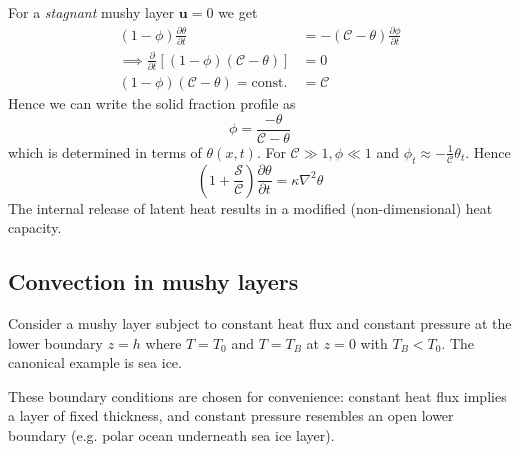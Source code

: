 \documentclass{jknotes}
\renewcommand{\u}{\symbf{u}}
\newcommand{\C}{\mathcal{C}}
\renewcommand{\S}{\mathcal{S}}
\begin{document}
For a \emph{stagnant} mushy layer $\u = 0$ we get
\begin{align}
	(1-\phi)\frac{\partial \theta}{\partial t} &= -(\C - \theta)\frac{\partial
	\phi}{\partial t} \\
		\implies \frac{\partial}{\partial t}\left[ (1-\phi)(\C-\theta)\right]
		&= 0 \\
	(1-\phi)(\C-\theta) = \text{const.} &= \C
\end{align}
Hence we can write the solid fraction profile as
\begin{equation}
	\phi = \frac{-\theta}{\C-\theta}
\end{equation}
which is determined in terms of $\theta(x,t)$. For $\C \gg 1, \phi \ll 1$ and
$\phi_t \approx -\frac{1}{\C}\theta_t$. Hence
\begin{equation}
	\left(1+\frac{\S}{\C}\right) \frac{\partial \theta}{\partial t} = \kappa
	\nabla^2 \theta
\end{equation}
The internal release of latent heat results in a modified (non-dimensional)
heat capacity.

\subsection{Convection in mushy layers}
Consider a mushy layer subject to constant heat flux and constant pressure at
the lower boundary $z=h$ where $T=T_0$ and $T=T_B$ at $z=0$ with $T_B < T_0$.
The canonical example is sea ice.
\begin{center}
\end{center}
These boundary conditions are chosen for convenience: constant heat flux
implies a layer of fixed thickness, and constant pressure resembles an open
lower boundary (e.g. polar ocean underneath sea ice layer).
\end{document}
